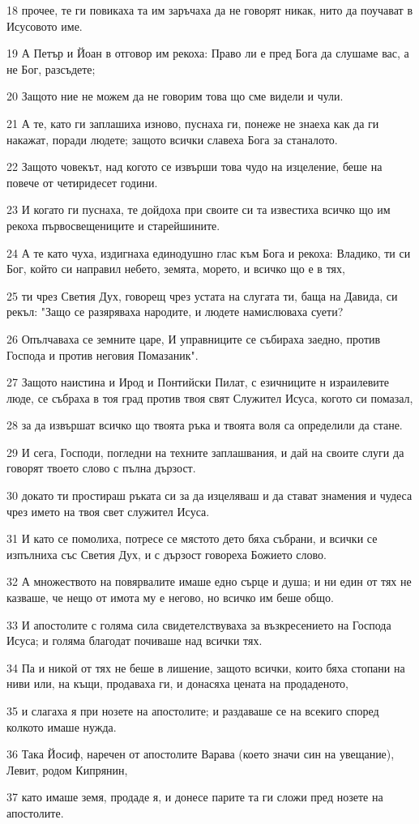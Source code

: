 \par 18 прочее, те ги повикаха та им заръчаха да не говорят никак, нито да поучават в Исусовото име.
\par 19 А Петър и Йоан в отговор им рекоха: Право ли е пред Бога да слушаме вас, а не Бог, разсъдете;
\par 20 Защото ние не можем да не говорим това що сме видели и чули.
\par 21 А те, като ги заплашиха изново, пуснаха ги, понеже не знаеха как да ги накажат, поради людете; защото всички славеха Бога за станалото.
\par 22 Защото човекът, над когото се извърши това чудо на изцеление, беше на повече от четиридесет години.
\par 23 И когато ги пуснаха, те дойдоха при своите си та известиха всичко що им рекоха първосвещениците и старейшините.
\par 24 А те като чуха, издигнаха единодушно глас към Бога и рекоха: Владико, ти си Бог, който си направил небето, земята, морето, и всичко що е в тях,
\par 25 ти чрез Светия Дух, говорещ чрез устата на слугата ти, баща на Давида, си рекъл: "Защо се разяряваха народите, и людете намислюваха суети?
\par 26 Опълчаваха се земните царе, И управниците се събираха заедно, против Господа и против неговия Помазаник".
\par 27 Защото наистина и Ирод и Понтийски Пилат, с езичниците н израилевите люде, се събраха в тоя град против твоя свят Служител Исуса, когото си помазал,
\par 28 за да извършат всичко що твоята ръка и твоята воля са определили да стане.
\par 29 И сега, Господи, погледни на техните заплашвания, и дай на своите слуги да говорят твоето слово с пълна дързост.
\par 30 докато ти простираш ръката си за да изцеляваш и да стават знамения и чудеса чрез името на твоя свет служител Исуса.
\par 31 И като се помолиха, потресе се мястото дето бяха събрани, и всички се изпълниха със Светия Дух, и с дързост говореха Божието слово.
\par 32 А множеството на повярвалите имаше едно сърце и душа; и ни един от тях не казваше, че нещо от имота му е негово, но всичко им беше общо.
\par 33 И апостолите с голяма сила свидетелствуваха за възкресението на Господа Исуса; и голяма благодат почиваше над всички тях.
\par 34 Па и никой от тях не беше в лишение, защото всички, които бяха стопани на ниви или, на къщи, продаваха ги, и донасяха цената на продаденото,
\par 35 и слагаха я при нозете на апостолите; и раздаваше се на всекиго според колкото имаше нужда.
\par 36 Така Йосиф, наречен от апостолите Варава (което значи син на увещание), Левит, родом Кипрянин,
\par 37 като имаше земя, продаде я, и донесе парите та ги сложи пред нозете на апостолите.

